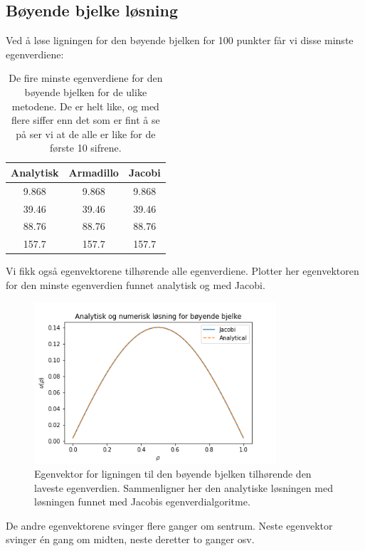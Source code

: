 \documentclass[reprint,english,notitlepage]{revtex4-1}
\begin{document}
\subsection{Bøyende bjelke løsning}
	Ved å løse ligningen for den bøyende bjelken for 100 punkter får vi disse minste egenverdiene:
	\begin{table}[H]
		\begin{center}
			\caption{De fire minste egenverdiene for den bøyende bjelken for de ulike metodene. De er helt like, og med flere siffer enn det som er fint å se på ser vi at de alle er like for de første 10 sifrene.}
			\label{tab:bbeig}
			\begin{tabular}{|c|c|c|} \hline
				\textbf{Analytisk} & \textbf{Armadillo} & \textbf{Jacobi} \\ \hline
				9.868 & 9.868 & 9.868 \\
				39.46 & 39.46 & 39.46 \\
				88.76 & 88.76 & 88.76 \\
				157.7 & 157.7 & 157.7\\ \hline
			\end{tabular}
		\end{center}
	\end{table}
	Vi fikk også egenvektorene tilhørende alle egenverdiene. Plotter her egenvektoren for den minste egenverdien funnet analytisk og med Jacobi.
	\begin{figure}[H]
		\includegraphics[width=90mm]{../Figures/bjelke1.png}
		\caption{Egenvektor for ligningen til den bøyende bjelken tilhørende den laveste egenverdien. Sammenligner her den analytiske løsningen med løsningen funnet med Jacobis egenverdialgoritme.}
		\label{fig:bb}
	\end{figure}
	De andre egenvektorene svinger flere ganger om sentrum. Neste egenvektor svinger én gang om midten, neste deretter to ganger osv.
	
\end{document}
